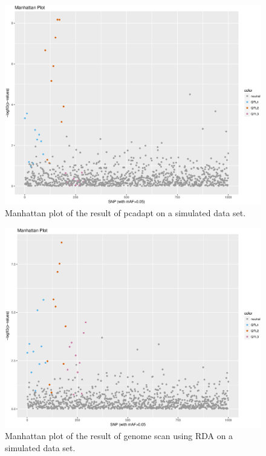 \documentclass[a4paper,times,10pt,authoryear]{article}%
\begin{document}
\begin{figure}[t]
\begin{center}
\includegraphics[height=0.21\textheight]{figures/sim105_pcadapt.eps}
\end{center}
\caption{Manhattan plot of the result of pcadapt on a simulated data set.}%
\label{fig:pcadapt}%
\end{figure}

\begin{figure}[t]
\begin{center}
\includegraphics[height=0.21\textheight]{figures/sim105_capscale.eps}
\end{center}
\caption{Manhattan plot of the result of genome scan using RDA on a simulated data set.}%
\label{fig:rda}%
\end{figure}
\end{document}
